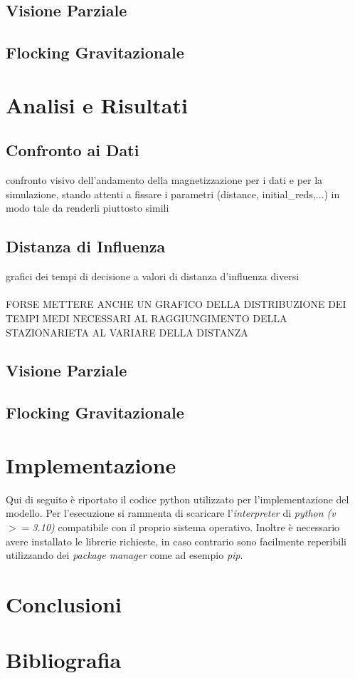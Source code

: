 \documentclass{article}
\begin{document}
\subsection{Visione Parziale}
\label{Sec:3.2}

\subsection{Flocking Gravitazionale}
\label{Sec:3.3}

\section{Analisi e Risultati}
\label{Sec:4}

\subsection{Confronto ai Dati}
\label{Sec:4.1}
confronto visivo dell'andamento della magnetizzazione per i dati e per la simulazione, stando attenti a fissare i parametri (distance, initial\_reds,...) in modo tale da renderli piuttosto simili

\subsection{Distanza di Influenza}
\label{Sec:4.2}
grafici dei tempi di decisione a valori di distanza d'influenza diversi
\\
\\ FORSE METTERE ANCHE UN GRAFICO DELLA DISTRIBUZIONE DEI TEMPI MEDI NECESSARI AL RAGGIUNGIMENTO DELLA STAZIONARIETA AL VARIARE DELLA DISTANZA

\subsection{Visione Parziale}
\label{Sec:4.3}

\subsection{Flocking Gravitazionale}
\label{Sec:4.4}

\section{Implementazione}
\label{Sec:5}
Qui di seguito è riportato il codice python utilizzato per l'implementazione del modello. Per l'esecuzione si rammenta di scaricare l'\textit{interpreter} di \textit{python (v ${>=}$3.10)} compatibile con il proprio sistema operativo. Inoltre è necessario avere installato le librerie richieste, in caso contrario sono facilmente reperibili utilizzando dei \textit{package manager} come ad esempio \textit{pip}.

\section{Conclusioni}
\label{Sec:6}

\section{Bibliografia}
\label{Sec:7}
\end{document}
